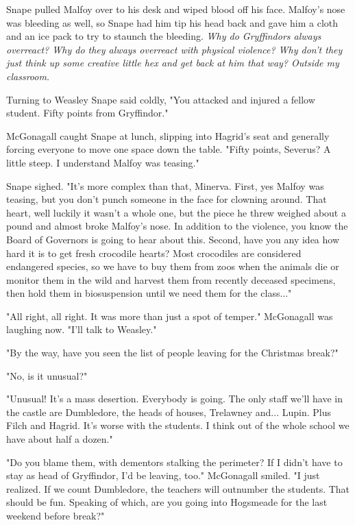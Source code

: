 \documentclass[a4paper,11pt]{article}
\begin{document}
Snape pulled Malfoy over to his desk and wiped blood off his face. Malfoy's nose was bleeding as well, so Snape had him tip his head back and gave him a cloth and an ice pack to try to staunch the bleeding. \emph{Why do Gryffindors always overreact? Why do they always overreact with physical violence? Why don't they just think up some creative little hex and get back at him that way? Outside my classroom.}

Turning to Weasley Snape said coldly, "You attacked and injured a fellow student. Fifty points from Gryffindor."

McGonagall caught Snape at lunch, slipping into Hagrid's seat and generally forcing everyone to move one space down the table. "Fifty points, Severus? A little steep. I understand Malfoy was teasing."

Snape sighed. "It's more complex than that, Minerva. First, yes Malfoy was teasing, but you don't punch someone in the face for clowning around. That heart, well luckily it wasn't a whole one, but the piece he threw weighed about a pound and almost broke Malfoy's nose. In addition to the violence, you know the Board of Governors is going to hear about this. Second, have you any idea how hard it is to get fresh crocodile hearts? Most crocodiles are considered endangered species, so we have to buy them from zoos when the animals die or monitor them in the wild and harvest them from recently deceased specimens, then hold them in biosuspension until we need them for the class..."

"All right, all right. It was more than just a spot of temper." McGonagall was laughing now. "I'll talk to Weasley."

"By the way, have you seen the list of people leaving for the Christmas break?"

"No, is it unusual?"

"Unusual! It's a mass desertion. Everybody is going. The only staff we'll have in the castle are Dumbledore, the heads of houses, Trelawney and... Lupin. Plus Filch and Hagrid. It's worse with the students. I think out of the whole school we have about half a dozen."

"Do you blame them, with dementors stalking the perimeter? If I didn't have to stay as head of Gryffindor, I'd be leaving, too." McGonagall smiled. "I just realized. If we count Dumbledore, the teachers will outnumber the students. That should be fun. Speaking of which, are you going into Hogsmeade for the last weekend before break?"
\end{document}

